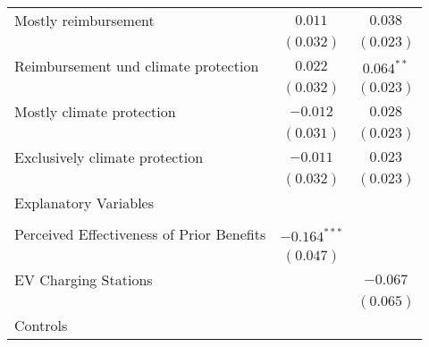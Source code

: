 \begin{center}
\begin{tiny}
\begin{longtable}{l@{} c@{} c@{}}
\quad Mostly reimbursement                                                                             & $0.011$          & $0.038$          \\
                                                                                                       & $(0.032)$        & $(0.023)$        \\
\quad Reimbursement und climate protection                                                             & $0.022$          & $0.064^{**}$     \\
                                                                                                       & $(0.032)$        & $(0.023)$        \\
\quad Mostly climate protection                                                                        & $-0.012$         & $0.028$          \\
                                                                                                       & $(0.031)$        & $(0.023)$        \\
\quad Exclusively climate protection                                                                   & $-0.011$         & $0.023$          \\
                                                                                                       & $(0.032)$        & $(0.023)$        \\
Explanatory Variables                                                                                  &                  &                  \\
                                                                                                       &                  &                  \\
\quad Perceived Effectiveness of Prior Benefits                                                        & $-0.164^{***}$   &                  \\
                                                                                                       & $(0.047)$        &                  \\
\quad EV Charging Stations                                                                             &                  & $-0.067$         \\
                                                                                                       &                  & $(0.065)$        \\
Controls                                                                                               &                  &                  \\

\end{longtable}
\end{tiny}
\end{center}
